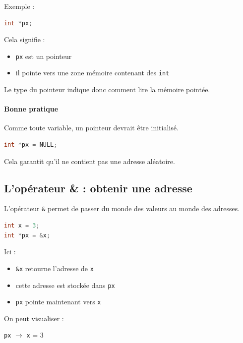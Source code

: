 Exemple :

\begin{lstlisting}[language=C]
int *px;
\end{lstlisting}

Cela signifie :

\begin{itemize}
    \item \texttt{px} est un pointeur
    \item il pointe vers une zone mémoire contenant des \texttt{int}
\end{itemize}

Le type du pointeur indique donc comment lire la mémoire pointée.

\paragraph{Bonne pratique}

Comme toute variable, un pointeur devrait être initialisé.

\begin{lstlisting}[language=C]
int *px = NULL;
\end{lstlisting}

Cela garantit qu’il ne contient pas une adresse aléatoire.

\subsection{L’opérateur \& : obtenir une adresse}

L’opérateur \texttt{\&} permet de passer du monde des valeurs
au monde des adresses.

\begin{lstlisting}[language=C]
int x = 3;
int *px = &x;
\end{lstlisting}

Ici :

\begin{itemize}
    \item \texttt{\&x} retourne l’adresse de \texttt{x}
    \item cette adresse est stockée dans \texttt{px}
    \item \texttt{px} pointe maintenant vers \texttt{x}
\end{itemize}

On peut visualiser :

\begin{center}
\texttt{px} $\rightarrow$ \texttt{x} = 3
\end{center}

